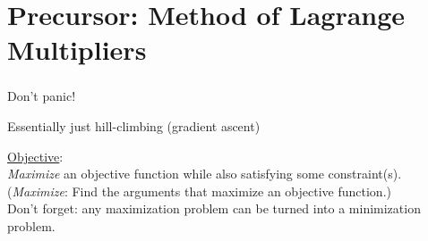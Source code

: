 \section{Precursor: Method of Lagrange Multipliers}


\begin{frame}\frametitle{\secname} 
    \begin{center}
    \slidesonly{\huge}
	Don't panic!
    \end{center}
    \begin{center}
        Essentially just hill-climbing (gradient ascent)
    \end{center}
    \pause

\underline{Objective}: \\
\textit{Maximize} an objective function while also satisfying some constraint(s).\\
{
\small(\textit{Maximize}: Find the arguments that maximize an objective function.)
}\\

Don't forget: any maximization problem can be turned into a minimization problem.
\end{frame}

